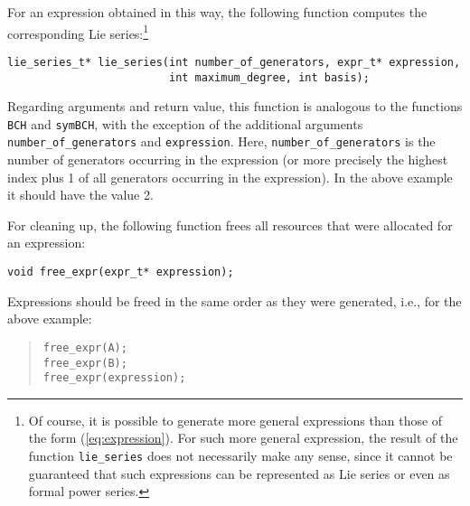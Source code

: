 \documentclass[11pt,a4paper]{article}
\begin{document}
For an expression obtained in this way, the following function
computes the corresponding Lie series:\footnote{Of course, it is possible to generate more general expressions 
than those of the form (\ref{eq:expression}). 
For such more general expression, the result of the function {\tt lie\_series} does not necessarily make any sense, 
since it cannot be guaranteed that such expressions can be represented as  Lie series or even
as  formal power series.}
%
%
%
\begin{verbatim}
lie_series_t* lie_series(int number_of_generators, expr_t* expression, 
                         int maximum_degree, int basis);
\end{verbatim}
Regarding arguments and return value, this function is analogous to the functions \verb|BCH| and \verb|symBCH|,
with the exception of the additional arguments \verb|number_of_generators| and \verb|expression|. 
Here, \verb|number_of_generators| is the number of generators occurring in the expression (or more
precisely the highest index plus 1 of all generators occurring in the expression). In the above example
it should have the value 2.

For cleaning up, the following function frees all resources that were allocated for an expression:
\begin{verbatim}
void free_expr(expr_t* expression);
\end{verbatim}
Expressions should be freed in the same order as they were generated, i.e., for the above example:
\begin{quote} %
{\small\begin{BVerbatim}
free_expr(A);
free_expr(B);
free_expr(expression);
\end{BVerbatim}
}
\end{quote}
\end{document}

